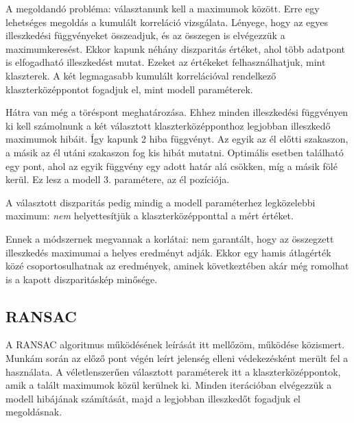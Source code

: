 A megoldandó probléma: választanunk kell a maximumok között.
Erre egy lehetséges megoldás a kumulált korreláció vizsgálata.
Lényege, hogy az egyes illeszkedési függvényeket összeadjuk, és az összegen is elvégezzük a maximumkeresést.
Ekkor kapunk néhány diszparitás értéket, ahol több adatpont is elfogadható illeszkedést mutat.
Ezeket az értékeket felhasználhatjuk, mint klaszterek.
A két legmagasabb kumulált korrelációval rendelkező klaszterközéppontot fogadjuk el, mint modell paraméterek.

Hátra van még a töréspont meghatározása.
Ehhez minden illeszkedési függvényen ki kell számolnunk a két választott klaszterközépponthoz legjobban illeszkedő maximumok hibáit.
Így kapunk 2 hiba függvényt.
Az egyik az él előtti szakaszon, a másik az él utáni szakaszon fog kis hibát mutatni.
Optimális esetben található egy pont, ahol az egyik függvény egy adott határ alá csökken, míg a másik fölé kerül.
Ez lesz a modell 3. paramétere, az él pozíciója.

A választott diszparitás pedig mindig a modell paraméterhez legközelebbi maximum: \emph{nem} helyettesítjük a klaszterközépponttal a mért értéket.

Ennek a módszernek megvannak a korlátai: nem garantált, hogy az összegzett illeszkedés maximumai a helyes eredményt adják.
Ekkor egy hamis átlagérték közé csoportosulhatnak az eredmények, aminek következtében akár még romolhat is a kapott diszparitáskép minősége.

\subsection{RANSAC}\label{sect:ransac}

A RANSAC algoritmus működésének leírását itt mellőzöm, működése közismert.
Munkám során az előző pont végén leírt jelenség elleni védekezésként merült fel a használata.
A véletlenszerűen választott paraméterek itt a klaszterközéppontok, amik a talált maximumok közül kerülnek ki.
Minden iterációban elvégezzük a modell hibájának számítását, majd a legjobban illeszkedőt fogadjuk el megoldásnak.